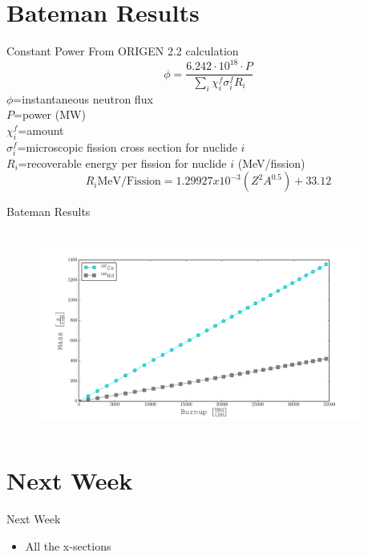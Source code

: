 \documentclass{beamer}
\begin{document}
\section{Bateman Results}
\begin{frame}{Constant Power}
  From ORIGEN 2.2 calculation
  \begin{equation*}
    \phi=\frac{6.242\cdot10^{18}\cdot P}{\sum_i \chi_i^f\sigma_i^fR_i}
  \end{equation*}
  $\phi$=instantaneous neutron flux\\
  $P$=power (MW)\\
  $\chi_i^f$=amount\\
  $\sigma_i^f$=microscopic fission cross section for nuclide $i$\\
  $R_i$=recoverable energy per fission for nuclide $i$ (MeV/fission)
  \begin{equation*}
    R_i\text{MeV/Fission}=1.29927x10^{-3}(Z^2A^{0.5})+33.12
  \end{equation*}
\end{frame}

\begin{frame}{Bateman Results}
  \begin{columns}
    \begin{column}{0.5\textwidth}
      \begin{figure}[H]
        \vspace*{-1cm}
        \begin{center}
          \includegraphics[scale = 0.4]{../../Calculations/Bateman/PlotBU/Plots/BurnCsComp_grams.pdf}
          \vspace{-0.5cm}
        \end{center}
      \end{figure}
    \end{column}
    \begin{column}{0.5\textwidth}
    \end{column}
  \end{columns}  
\end{frame}





\section{Next Week}
\begin{frame}{Next Week}
  \begin{itemize}
  \item{All the x-sections}
  \end{itemize}
\end{frame}
\end{document}
